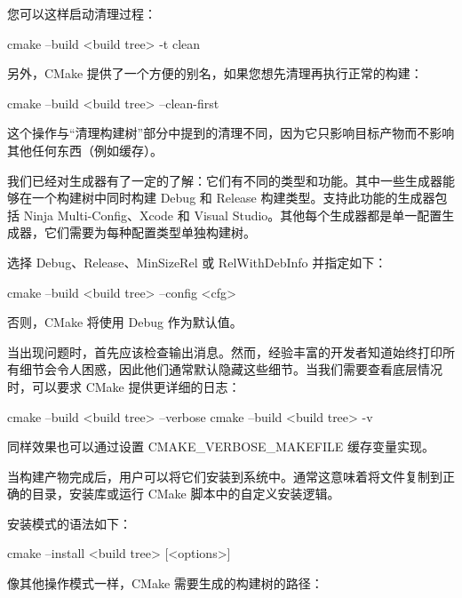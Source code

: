 您可以这样启动清理过程：

\begin{shell}
cmake --build <build tree> -t clean
\end{shell}

另外，CMake 提供了一个方便的别名，如果您想先清理再执行正常的构建：

\begin{shell}
cmake --build <build tree> --clean-first
\end{shell}

这个操作与“清理构建树”部分中提到的清理不同，因为它只影响目标产物而不影响其他任何东西（例如缓存）。


我们已经对生成器有了一定的了解：它们有不同的类型和功能。其中一些生成器能够在一个构建树中同时构建 Debug 和 Release 构建类型。支持此功能的生成器包括 Ninja Multi-Config、Xcode 和 Visual Studio。其他每个生成器都是单一配置生成器，它们需要为每种配置类型单独构建树。

选择 Debug、Release、MinSizeRel 或 RelWithDebInfo 并指定如下：

\begin{shell}
cmake --build <build tree> --config <cfg>
\end{shell}

否则，CMake 将使用 Debug 作为默认值。


当出现问题时，首先应该检查输出消息。然而，经验丰富的开发者知道始终打印所有细节会令人困惑，因此他们通常默认隐藏这些细节。当我们需要查看底层情况时，可以要求 CMake 提供更详细的日志：

\begin{shell}
cmake --build <build tree> --verbose
cmake --build <build tree> -v
\end{shell}

同样效果也可以通过设置 CMAKE\_VERBOSE\_MAKEFILE 缓存变量实现。


当构建产物完成后，用户可以将它们安装到系统中。通常这意味着将文件复制到正确的目录，安装库或运行 CMake 脚本中的自定义安装逻辑。

安装模式的语法如下：

\begin{shell}
cmake --install <build tree> [<options>]
\end{shell}

像其他操作模式一样，CMake 需要生成的构建树的路径：


